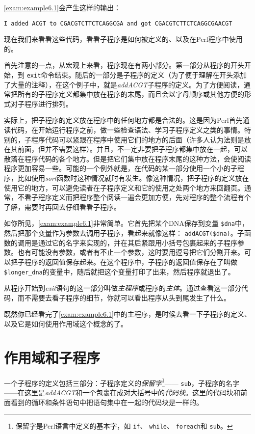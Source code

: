 \autoref{exam:example6.1}会产生这样的输出：

\begin{lstlisting}
I added ACGT to CGACGTCTTCTCAGGCGA and got CGACGTCTTCTCAGGCGAACGT
\end{lstlisting}

现在我们来看看这些代码，看看子程序是如何被定义的、以及在Perl程序中使用的。

首先注意的一点，从宏观上来看，程序现在有两小部分。第一部分从程序的开头开始，到  \verb|exit|命令结束。随后的一部分是子程序的定义（为了便于理解在开头添加了大量的注释），在这个例子中，就是\textit{addACGT}子程序的定义。为了方便阅读，通常把所有的子程序定义都集中放在程序的末尾，而且会以字母顺序或其他方便的形式对子程序进行排列。

实际上，把子程序的定义放在程序中的任何地方都是合法的。这是因为Perl首先通读代码，在开始运行程序之前，做一些检查语法、学习子程序定义之类的事情。特别的，子程序代码可以紧跟在程序中使用它们的地方的后面（许多人认为法则是放在其前面，但并不需要这样）。并且，不一定非要把子程序都集中放在一起，可以散落在程序代码的各个地方。但是把它们集中放在程序末尾的这种方法，会使阅读程序更加容易一些。可能的一个例外就是，在代码的某一部分使用一个小的子程序，比如使用\textit{sort}函数时这种情况就时有发生。像这种情况，把子程序的定义放在使用它的地方，可以避免读者在子程序定义和它的使用之处两个地方来回翻页。通常，不看子程序定义而把程序整个阅读一遍会更加方便，先对程序的整个流程有个了解，需要时再回去仔细看看子程序。

如你所见，\autoref{exam:example6.1}非常简单。它首先把某个DNA保存到变量  \verb|$dna|中，然后把那个变量作为参数去调用子程序，看起来就像这样：  \verb|addACGT($dna)|。子函数的调用是通过它的名字来实现的，并在其后紧跟用小括号包裹起来的子程序参数。也有可能没有参数，或者有不止一个参数，这时要用逗号把它们分割开来。可以把子程序的返回值保存起来。在这个程序中，子程序的返回值保存在了叫做  \verb|$longer_dna|的变量中，随后就把这个变量打印了出来，然后程序就退出了。

从程序开始到\textit{exit}语句的这一部分叫做\textit{主程序}或程序的\textit{主体}。通过查看这一部分代码，而不需要去看子程序的细节，你就可以看出程序从头到尾发生了什么。

既然你已经看完了\autoref{exam:example6.1}中的主程序，是时候去看一下子程序的定义、以及它是如何使用作用域这个概念的了。

\section{作用域和子程序}
一个子程序的定义包括三部分：子程序定义的\textit{保留字}\footnote{保留字是Perl语言中定义的基本字，如  \verb|if|、 \verb|while|、 \verb|foreach|和  \verb|sub|。}—— \verb|sub|，子程序的名字——在这里是\textit{addACGT}和一个包裹在成对大括号中的\textit{代码块}。这里的代码块和前面看到的循环和条件语句中把语句集中在一起的代码块是一样的。

